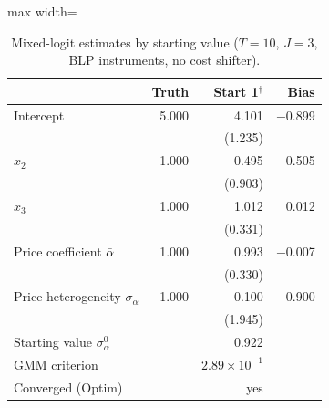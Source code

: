\begin{table}[H]
\centering\small
\caption{Mixed-logit estimates by starting value ($T=10$, $J=3$, BLP instruments, no cost shifter).}\label{tab:q8e_estimates}
\begin{adjustbox}{max width=\linewidth}
\begin{tabular}{lrrr}
\toprule
 & Truth & Start 1$^{\dagger}$ & Bias \\
\midrule
Intercept & 5.000 & 4.101 & $-$0.899 \\
 &  & (1.235) &  \\
$x_{2}$ & 1.000 & 0.495 & $-$0.505 \\
 &  & (0.903) &  \\
$x_{3}$ & 1.000 & 1.012 & 0.012 \\
 &  & (0.331) &  \\
Price coefficient $\bar\alpha$ & 1.000 & 0.993 & $-$0.007 \\
 &  & (0.330) &  \\
Price heterogeneity $\sigma_\alpha$ & 1.000 & 0.100 & $-$0.900 \\
 &  & (1.945) &  \\
\midrule
Starting value $\sigma_\alpha^{0}$ & & 0.922 & \\
GMM criterion & & $2.89\times 10^{-1}$ & \\
Converged (Optim) & & yes & \\
\bottomrule
\end{tabular}
\end{adjustbox}
\par{}
\end{table}
